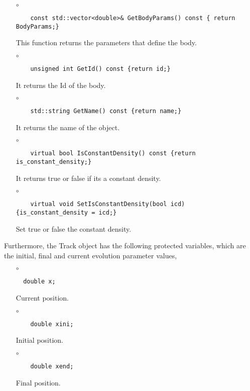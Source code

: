 \begin{itemize}
\item[$\circ$]  
  \begin{lstlisting}
    const std::vector<double>& GetBodyParams() const { return BodyParams;}
  \end{lstlisting}
  This function returns the parameters that define the body.

\item[$\circ$]  
  \begin{lstlisting}
    unsigned int GetId() const {return id;}
  \end{lstlisting}
  It returns the Id of the body.

\item[$\circ$]  
  \begin{lstlisting}
    std::string GetName() const {return name;}
  \end{lstlisting}
  It returns the name of the object.

\item[$\circ$]  
  \begin{lstlisting}
    virtual bool IsConstantDensity() const {return is_constant_density;}
  \end{lstlisting}
  It returns true or false if its a  constant density.

\item[$\circ$]  
  \begin{lstlisting}
    virtual void SetIsConstantDensity(bool icd) {is_constant_density = icd;}
  \end{lstlisting}
  Set true or false the constant density. 
\end{itemize}
Furthermore, the {\ttf Track} object has the following protected
variables, which are the initial, final and current
evolution parameter values,
%
%
\begin{itemize}
\item[$\circ$]  
  \begin{lstlisting}
  double x;
  \end{lstlisting}
  Current position.
\item[$\circ$]  
  \begin{lstlisting}
    double xini;
  \end{lstlisting}
  Initial position.
\item[$\circ$]  
  \begin{lstlisting}
    double xend;
  \end{lstlisting}
  Final position.
\end{itemize}
%
